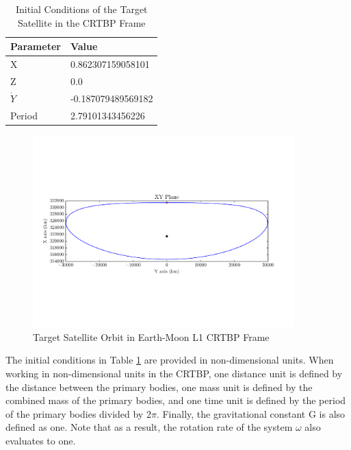 \documentclass[a4paper]{article}
\begin{document}
\begin{table}[h] 
	\begin{center}
		\begin{tabular}{l l}
			\toprule
			Parameter   & Value \\
			\midrule
			X                & 0.862307159058101 \\
			Z                & 0.0 \\
			\(\dot{Y}\)      & -0.187079489569182 \\
			Period           & 2.79101343456226 \\
			\bottomrule
		\end{tabular}
		\caption{Initial Conditions of the Target Satellite in the CRTBP Frame}
		\label{tab:IC_1}
	\end{center}
\end{table}

\begin{figure}[h]
	\begin{center}
		\includegraphics[width=0.9\textwidth]{Target_Full_Orbit_1}
		\caption{Target Satellite Orbit in Earth-Moon L1 CRTBP Frame}
		\label{fig:FullOrbit_1}
	\end{center}
\end{figure}

The initial conditions in Table \ref{tab:IC_1} are provided in non-dimensional units. When working in non-dimensional units in the CRTBP, one distance unit is defined by the distance between the primary bodies, one mass unit is defined by the combined mass of the primary bodies, and one time unit is defined by the period of the primary bodies divided by 2\(\pi\).  Finally, the gravitational constant G is also defined as one. Note that as a result, the rotation rate of the system \(\omega\) also evaluates to one. 
\end{document}
